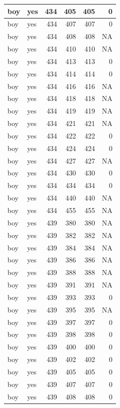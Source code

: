 \documentclass[man]{apa6}
\begin{document}
\begin{tabular}{l|l|r|r|r|r}
\hline
boy & yes & 434 & 405 & 405 & 0\\
\hline
boy & yes & 434 & 407 & 407 & 0\\
\hline
boy & yes & 434 & 408 & 408 & NA\\
\hline
boy & yes & 434 & 410 & 410 & NA\\
\hline
boy & yes & 434 & 413 & 413 & 0\\
\hline
boy & yes & 434 & 414 & 414 & 0\\
\hline
boy & yes & 434 & 416 & 416 & NA\\
\hline
boy & yes & 434 & 418 & 418 & NA\\
\hline
boy & yes & 434 & 419 & 419 & NA\\
\hline
boy & yes & 434 & 421 & 421 & NA\\
\hline
boy & yes & 434 & 422 & 422 & 0\\
\hline
boy & yes & 434 & 424 & 424 & 0\\
\hline
boy & yes & 434 & 427 & 427 & NA\\
\hline
boy & yes & 434 & 430 & 430 & 0\\
\hline
boy & yes & 434 & 434 & 434 & 0\\
\hline
boy & yes & 434 & 440 & 440 & NA\\
\hline
boy & yes & 434 & 455 & 455 & NA\\
\hline
boy & yes & 439 & 380 & 380 & NA\\
\hline
boy & yes & 439 & 382 & 382 & NA\\
\hline
boy & yes & 439 & 384 & 384 & NA\\
\hline
boy & yes & 439 & 386 & 386 & NA\\
\hline
boy & yes & 439 & 388 & 388 & NA\\
\hline
boy & yes & 439 & 391 & 391 & NA\\
\hline
boy & yes & 439 & 393 & 393 & 0\\
\hline
boy & yes & 439 & 395 & 395 & NA\\
\hline
boy & yes & 439 & 397 & 397 & 0\\
\hline
boy & yes & 439 & 398 & 398 & 0\\
\hline
boy & yes & 439 & 400 & 400 & 0\\
\hline
boy & yes & 439 & 402 & 402 & 0\\
\hline
boy & yes & 439 & 405 & 405 & 0\\
\hline
boy & yes & 439 & 407 & 407 & 0\\
\hline
boy & yes & 439 & 408 & 408 & 0\\

\end{tabular}
\end{document}
